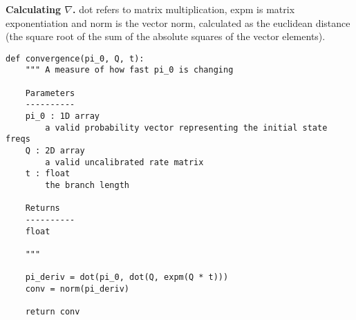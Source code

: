 \begin{algorithm}[ht!]
\caption[Algorithm]{\textbf{Calculating $\nabla$.} dot refers to matrix multiplication, expm is matrix exponentiation and norm is the vector norm, calculated as the euclidean distance (the square root of the sum of the absolute squares of the vector elements).}
\label{alg:convergence}
\begin{verbatim}
def convergence(pi_0, Q, t):
    """ A measure of how fast pi_0 is changing
    
    Parameters
    ----------
    pi_0 : 1D array
        a valid probability vector representing the initial state freqs
    Q : 2D array 
        a valid uncalibrated rate matrix
    t : float
        the branch length 
    
    Returns
    ----------   
    float
    
    """

    pi_deriv = dot(pi_0, dot(Q, expm(Q * t)))
    conv = norm(pi_deriv)

    return conv
\end{verbatim}
\end{algorithm}

